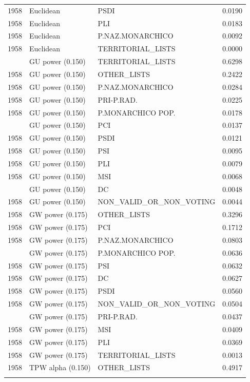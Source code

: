 \begin{longtable}[t]{rllr}
1958 & Euclidean & PSDI & 0.0190\\
1958 & Euclidean & PLI & 0.0183\\
1958 & Euclidean & P.NAZ.MONARCHICO & 0.0092\\
1958 & Euclidean & TERRITORIAL\_LISTS & 0.0000\\
\addlinespace
1958 & GU power (0.150) & TERRITORIAL\_LISTS & 0.6298\\
1958 & GU power (0.150) & OTHER\_LISTS & 0.2422\\
1958 & GU power (0.150) & P.NAZ.MONARCHICO & 0.0284\\
1958 & GU power (0.150) & PRI-P.RAD. & 0.0225\\
1958 & GU power (0.150) & P.MONARCHICO POP. & 0.0178\\
\addlinespace
1958 & GU power (0.150) & PCI & 0.0137\\
1958 & GU power (0.150) & PSDI & 0.0121\\
1958 & GU power (0.150) & PSI & 0.0095\\
1958 & GU power (0.150) & PLI & 0.0079\\
1958 & GU power (0.150) & MSI & 0.0068\\
\addlinespace
1958 & GU power (0.150) & DC & 0.0048\\
1958 & GU power (0.150) & NON\_VALID\_OR\_NON\_VOTING & 0.0044\\
1958 & GW power (0.175) & OTHER\_LISTS & 0.3296\\
1958 & GW power (0.175) & PCI & 0.1712\\
1958 & GW power (0.175) & P.NAZ.MONARCHICO & 0.0803\\
\addlinespace
1958 & GW power (0.175) & P.MONARCHICO POP. & 0.0636\\
1958 & GW power (0.175) & PSI & 0.0632\\
1958 & GW power (0.175) & DC & 0.0627\\
1958 & GW power (0.175) & PSDI & 0.0560\\
1958 & GW power (0.175) & NON\_VALID\_OR\_NON\_VOTING & 0.0504\\
\addlinespace
1958 & GW power (0.175) & PRI-P.RAD. & 0.0437\\
1958 & GW power (0.175) & MSI & 0.0409\\
1958 & GW power (0.175) & PLI & 0.0369\\
1958 & GW power (0.175) & TERRITORIAL\_LISTS & 0.0013\\
1958 & TPW alpha (0.150) & OTHER\_LISTS & 0.4917\\
\addlinespace

\end{longtable}
